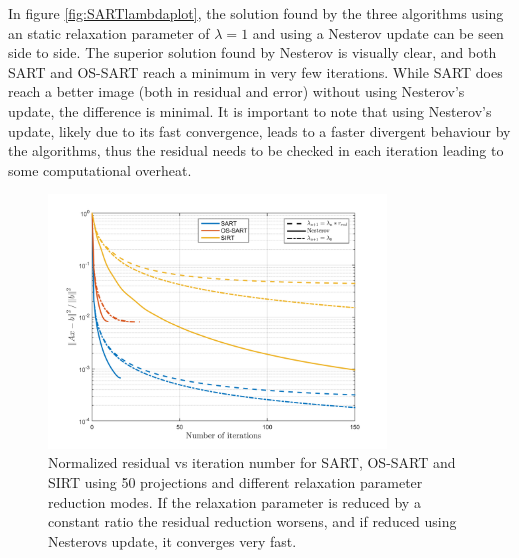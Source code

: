 In figure \ref{fig:SARTlambdaplot}, the solution found by the three algorithms using an static relaxation parameter of $\lambda=1$ and using a Nesterov update can be seen side to side. The superior solution found by Nesterov is visually clear, and both SART and OS-SART reach a minimum in very few iterations. While SART does reach a better image (both in residual and error) without using Nesterov's update, the difference is minimal. It is important to note that using Nesterov's update, likely due to its fast convergence, leads to a faster divergent behaviour by the algorithms, thus the residual needs to be checked in each iteration leading to some computational overheat.

\begin{figure}[H]
\begin{center}

\includegraphics[width=0.8\textwidth]{Applications/SARTlambda.png} 
\end{center}

\caption[Nomralized residual vs iteration of SART/OS-SART/SIRT with different relacation parameters]{\label{fig:SARTlambda} Normalized residual vs iteration number for SART, OS-SART and SIRT using 50 projections and different relaxation parameter reduction modes. If the relaxation parameter is reduced by a constant ratio the residual reduction worsens, and if reduced using Nesterovs update, it converges very fast.} 
\end{figure}


